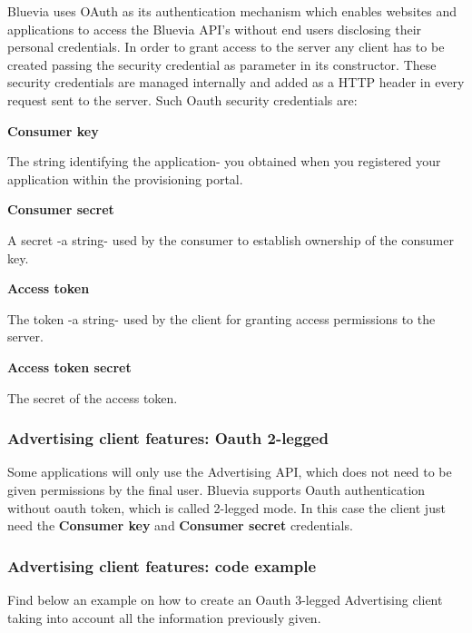 Bluevia uses OAuth as its authentication mechanism which enables websites and applications to access the Bluevia API's without end users disclosing their personal credentials. In order to grant access to the server any client has to be created passing the security credential as parameter in its constructor. These security credentials are managed internally and added as a HTTP header in every request sent to the server. Such Oauth security credentials are: 
\begin{DoxyItemize}
\item {\bfseries Consumer key} \par
The string identifying the application-\/ you obtained when you registered your application within the provisioning portal.


\item {\bfseries Consumer secret} \par
A secret -\/a string-\/ used by the consumer to establish ownership of the consumer key.


\item {\bfseries Access token} \par
The token -\/a string-\/ used by the client for granting access permissions to the server.


\item {\bfseries Access token secret} \par
The secret of the access token. 
\end{DoxyItemize}\hypertarget{blv_ad_guide_adclient_features_security_credentials_2l}{}\subsubsection{Advertising client features: Oauth 2-\/legged}\label{blv_ad_guide_adclient_features_security_credentials_2l}
Some applications will only use the Advertising API, which does not need to be given permissions by the final user. Bluevia supports Oauth authentication without oauth token, which is called 2-\/legged mode. In this case the client just need the {\bfseries Consumer key} and {\bfseries Consumer secret} credentials.\hypertarget{blv_ad_guide_adclient_features_code_examples_sec}{}\subsubsection{Advertising client features: code example}\label{blv_ad_guide_adclient_features_code_examples_sec}
Find below an example on how to create an Oauth 3-\/legged Advertising client taking into account all the information previously given.


